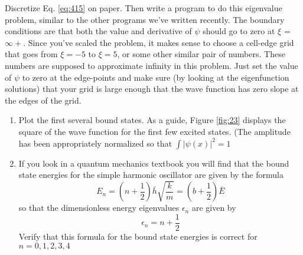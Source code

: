 \begin{problem} \label{P4.4}
Discretize Eq. \eqref{eq:415} on paper. Then write a program to do this eigenvalue
problem, similar to the other programs we\rq ve written recently. The boundary conditions are that both the value and derivative of $\psi$ should go to zero
at $\xi$ = $\infty +$. Since you\rq ve scaled the problem, it makes sense to choose a
cell-edge grid that goes from $\xi =  - 5$ to $\xi  = 5$, or some other similar pair
of numbers. These numbers are supposed to approximate infinity in this
problem. Just set the value of $\psi$ to zero at the edge-points and make sure
(by looking at the eigenfunction solutions) that your grid is large enough
that the wave function has zero slope at the edges of the grid.


\begin{enumerate}[label=(\alph*)]
\item Plot the first several bound states. As a guide, Figure \ref{fig:23} displays the square
of the wave function for the first few excited states. (The amplitude has
been appropriately normalized so that $ \int |ψ(x)|^2 = 1$
\item  If you look in a quantum mechanics textbook you will find that the bound
state energies for the simple harmonic oscillator are given by the formula
\begin{equation}\label{eq:416}
E_n = (n + \frac{1}{2}) \bar{h}\sqrt{\frac{k}{m}} =(b+\frac{1}{2})\bar{E}
\end{equation}
so that the dimensionless energy eigenvalues $\epsilon_n$ are given by
\begin{equation}\label{eq:417}
\epsilon_n = n + \frac{1}{2}
\end{equation}
Verify that this formula for the bound state energies is correct for $n =
0,1,2,3,4$

\end{enumerate}
\end{problem}

